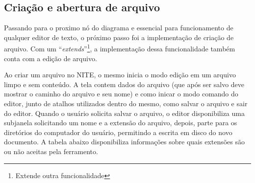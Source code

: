 \subsection{Criação e abertura de arquivo}

Passando para o proximo nó do diagrama e essencial para funcionamento de qualquer editor de texto, o próximo passo foi a implementação de criação de arquivo. Com um ``\textit{extends}''\footnote{Extende outra funcionalidade}, a implementação dessa funcionalidade também conta com a edição de arquivo.

Ao criar um arquivo no NITE, o mesmo inicia o modo edição em um arquivo limpo e sem conteúdo. A tela contem dados do arquivo (que após ser salvo deve mostrar o caminho do arquivo e seu nome) e como inicar o modo comando do editor, junto de atalhos utilizados dentro do mesmo, como salvar o arquivo e sair do editor. Quando o usuário solicita salvar o arquivo, o editor disponibiliza uma subjanela solicitando um nome e a extensão do arquivo, depois, parte para os diretórios do computador do usuário, permitindo a escrita em disco do novo documento. A tabela abaixo disponibiliza informações sobre quais extensões são ou não aceitas pela ferramento.

